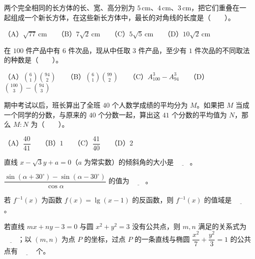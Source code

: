 \begin{question}
两个完全相同的长方体的长、宽、高分别为 $5\,\text{cm}$、$4\,\text{cm}$、$3\,\text{cm}$，把它们重叠在一起组成一个新长方体，在这些新长方体中，最长的对角线的长度是\mbox{（　　）}。

（A）$\sqrt{77}\,\text{cm}$　　（B）$7\sqrt2\,\text{cm}$　　（C）$5\sqrt5\,\text{cm}$　　（D）$10\sqrt2\,\text{cm}$

\end{question}
\begin{question}
在 $100$ 件产品中有 $6$ 件次品，现从中任取 $3$ 件产品，至少有 $1$ 件次品的不同取法的种数是\mbox{（　　）}。

（A）$\binom61\binom{94}2$　　（B）$\binom61\binom{99}2$　　（C）$A_{100}^3-A_{94}^3$　　（D）$\binom{100}3-\binom{94}3$

\end{question}
\begin{question}
期中考试以后，班长算出了全班 $40$ 个人数学成绩的平均分为 $M$。如果把 $M$ 当成一个同学的分数，与原来的 $40$ 个分数一起，算出这 $41$ 个分数的平均值为 $N$，那么 $M:N$ 为\mbox{（　　）}。

（A）$\dfrac{40}{41}$　　（B）$1$　　（C）$\dfrac{41}{40}$　　（D）$2$

\end{question}

\begin{question}
直线 $x-\sqrt3y+a=0$（$a$ 为常实数）的倾斜角的大小是 $\underline{\qquad}$。

\end{question}
\begin{question}
$\dfrac{\sin(\alpha+30^\circ)-\sin(\alpha-30^\circ)}{\cos\alpha}$ 的值为 $\underline{\qquad}$。

\end{question}
\begin{question}
若 $f^{-1}(x)$ 为函数 $f(x)=\lg(x-1)$ 的反函数，则 $f^{-1}(x)$ 的值域是 $\underline{\qquad}$。

\end{question}
\begin{question}
若直线 $mx+ny-3=0$ 与圆 $x^2+y^2=3$ 没有公共点，则 $m,n$ 满足的关系式为 $\underline{\qquad}$；以 $(m,n)$ 为点 $P$ 的坐标，过点 $P$ 的一条直线与椭圆 $\dfrac{x^2}{7}+\dfrac{y^2}{3}=1$ 的公共点有 $\underline{\qquad}$ 个。

\end{question}


